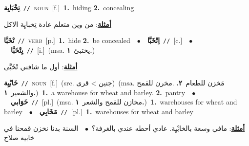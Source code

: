 \documentclass[10pt,a4paper,twoside]{article} %
\begin{document}
\begin{multicols}{2}
{\setlength\topsep{0pt}\textbf{\foreignlanguage{arabic}{تِخْبَايِة}}\ {\color{gray}\texttt{//}\color{black}}\ \textsc{noun}\ [f.]\ \textbf{1.}~hiding  \textbf{2.}~concealing\  \begin{flushright}\color{gray}\foreignlanguage{arabic}{\textbf{\underline{\foreignlanguage{arabic}{أمثلة}}}: من وين متعلم عادة تِخبايِة الاكل}\end{flushright}\color{black}} \vspace{2mm}

{\setlength\topsep{0pt}\textbf{\foreignlanguage{arabic}{تْخَبَّا}}\ {\color{gray}\texttt{//}\color{black}}\ \textsc{verb}\ [p.]\ \textbf{1.}~hide  \textbf{2.}~be concealed\ \ $\bullet$\ \ \setlength\topsep{0pt}\textbf{\foreignlanguage{arabic}{اِتْخَبَّا}}\ {\color{gray}\texttt{//}\color{black}}\ [c.]\ \ $\bullet$\ \ \setlength\topsep{0pt}\textbf{\foreignlanguage{arabic}{يِتْخَبَّا}}\ {\color{gray}\texttt{//}\color{black}}\ [i.]\ \color{gray}(msa. \foreignlanguage{arabic}{يختبئ}~\foreignlanguage{arabic}{\textbf{١.}})\color{black}\  \begin{flushright}\color{gray}\foreignlanguage{arabic}{\textbf{\underline{\foreignlanguage{arabic}{أمثلة}}}: أول ما شافني تْخَبَّى}\end{flushright}\color{black}} \vspace{2mm}

{\setlength\topsep{0pt}\textbf{\foreignlanguage{arabic}{خَابْيِة}}\ {\color{gray}\texttt{//}\color{black}}\ \textsc{noun}\ [f.]\ (src. \color{gray}\foreignlanguage{arabic}{جنين > قرى}\color{black})\ \color{gray}(msa. \foreignlanguage{arabic}{مَخزن للطعام}~\foreignlanguage{arabic}{\textbf{٢.}}  .\foreignlanguage{arabic}{مخرن للقمح والشعير}~\foreignlanguage{arabic}{\textbf{١.}})\color{black}\ \textbf{1.}~a warehouse for wheat and barley.  \textbf{2.}~pantry\ \ $\bullet$\ \ \setlength\topsep{0pt}\textbf{\foreignlanguage{arabic}{خَوَابي}}\ {\color{gray}\texttt{//}\color{black}}\ [pl.]\ \color{gray}(msa. \foreignlanguage{arabic}{مخازن للقمح والشعر}~\foreignlanguage{arabic}{\textbf{١.}})\color{black}\ \textbf{1.}~warehouses for wheat and barley\ \ $\bullet$\ \ \setlength\topsep{0pt}\textbf{\foreignlanguage{arabic}{مَخَابِي}}\ {\color{gray}\texttt{//}\color{black}}\ [pl.]\ \textbf{1.}~warehouses for wheat and barley\  \begin{flushright}\color{gray}\foreignlanguage{arabic}{\textbf{\underline{\foreignlanguage{arabic}{أمثلة}}}: مافي وسعة بالخابْيِة. عادي أحطه عندي بالغرفة؟\ $\bullet$\ \  السنة بدنا نخزن قمحنا في خابية صلاح}\end{flushright}\color{black}} \vspace{2mm}


\end{multicols}
\end{document}
